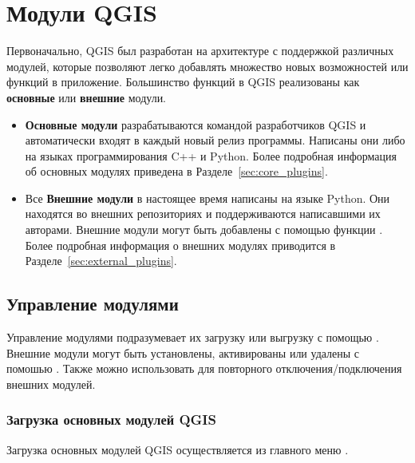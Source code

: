 
\chapter{Модули QGIS}\label{sec:plugins}


Первоначально, QGIS был разработан на архитектуре с поддержкой различных
модулей, которые позволяют легко добавлять множество новых возможностей
или функций в приложение. Большинство функций в QGIS реализованы как
\textbf{основные} или \textbf{внешние} модули.

\begin{itemize}[label=--]
\item \textbf{Основные модули} разрабатываются командой разработчиков
QGIS и автоматически входят в каждый новый релиз программы. Написаны они
либо на языках программирования C++ и Python. Более подробная информация
об основных модулях приведена в Разделе~\ref{sec:core_plugins}.
\item Все \textbf{Внешние модули} в настоящее время написаны на языке
Python. Они находятся во внешних репозиториях и поддерживаются
написавшими их авторами. Внешние модули могут быть добавлены с помощью
функции . Более подробная информация
о внешних модулях приводится в Разделе~\ref{sec:external_plugins}.
\end{itemize}

\section{Управление модулями}\label{sec:managing_plugins}

Управление модулями подразумевает их загрузку или выгрузку с помощью
. Внешние модули могут быть установлены,
активированы или удалены с помошью .
Также  можно использовать для повторного
отключения/подключения внешних модулей.

\subsection{Загрузка основных модулей QGIS}\label{sec:load_core_plugin}

Загрузка основных модулей QGIS осуществляется из главного меню
 \arrow
{}.

